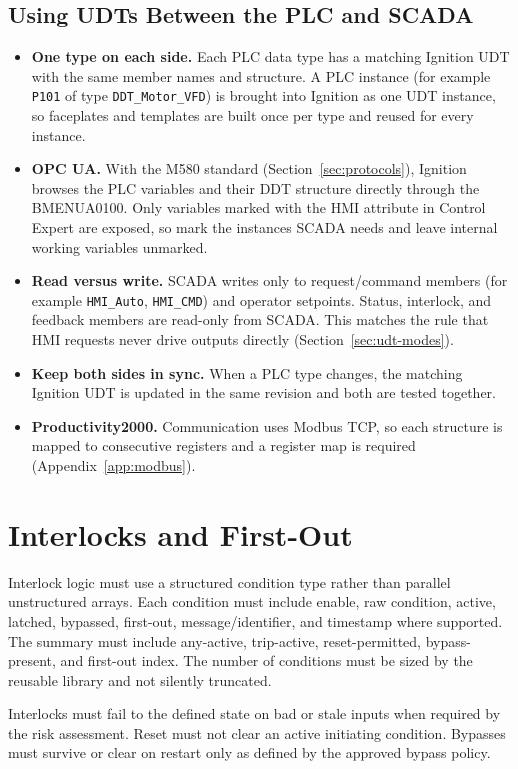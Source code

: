 \subsection{Using UDTs Between the PLC and SCADA}
\begin{itemize}[itemsep=2pt]
  \item \textbf{One type on each side.} Each PLC data type has a matching Ignition UDT with the same member names and structure. A PLC instance (for example \texttt{P101} of type \texttt{DDT\_Motor\_VFD}) is brought into Ignition as one UDT instance, so faceplates and templates are built once per type and reused for every instance.
  \item \textbf{OPC UA.} With the M580 standard (Section~\ref{sec:protocols}), Ignition browses the PLC variables and their DDT structure directly through the BMENUA0100. Only variables marked with the HMI attribute in Control Expert are exposed, so mark the instances SCADA needs and leave internal working variables unmarked.
  \item \textbf{Read versus write.} SCADA writes only to request/command members (for example \texttt{HMI\_Auto}, \texttt{HMI\_CMD}) and operator setpoints. Status, interlock, and feedback members are read-only from SCADA. This matches the rule that HMI requests never drive outputs directly (Section~\ref{sec:udt-modes}).
  \item \textbf{Keep both sides in sync.} When a PLC type changes, the matching Ignition UDT is updated in the same revision and both are tested together.
  \item \textbf{Productivity2000.} Communication uses Modbus TCP, so each structure is mapped to consecutive registers and a register map is required (Appendix~\ref{app:modbus}).
\end{itemize}

\section{Interlocks and First-Out}
Interlock logic must use a structured condition type rather than parallel unstructured arrays. Each condition must include enable, raw condition, active, latched, bypassed, first-out, message/identifier, and timestamp where supported. The summary must include any-active, trip-active, reset-permitted, bypass-present, and first-out index. The number of conditions must be sized by the reusable library and not silently truncated.

Interlocks must fail to the defined state on bad or stale inputs when required by the risk assessment. Reset must not clear an active initiating condition. Bypasses must survive or clear on restart only as defined by the approved bypass policy.

